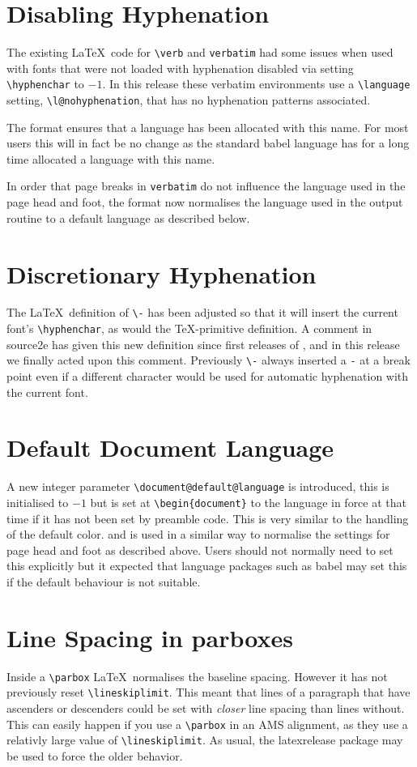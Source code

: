 \documentclass{ltnews}
\begin{document}
\section{Disabling Hyphenation}
The existing \LaTeX\ code for \verb|\verb| and \verb|verbatim| had some
issues when used with fonts that were not loaded with hyphenation
disabled via setting \verb|\hyphenchar| to $-1$. In this release these
verbatim environments use a \verb|\language| setting,
\verb|\l@nohyphenation|, that has no hyphenation patterns associated. 

The format ensures that  a language has been allocated with this name.
For most users this will in fact be no change as the standard
\textsf{babel} language has for a long time allocated a language with
this name.

In order that page breaks in \texttt{verbatim} do not influence the
language used in the page head and foot, the format now normalises the
language used in the output routine to a default language as described
below.
 
\section{Discretionary Hyphenation}
The \LaTeX\ definition of \verb|\-| has been adjusted so that it will
insert the current font's \verb|\hyphenchar|, as would the
\TeX-primitive definition. A comment in \textsf{source2e} has given
this new definition since first releases of \LaTeXe, and in this
release we finally acted upon this comment. Previously \verb|\-|
always inserted a \texttt{-} at a break point even if a different
character would be used for automatic hyphenation with the current font.

\section{Default Document Language}

A new integer parameter \verb|\document@default@language| is
introduced, this is initialised to $-1$ but is set at
\verb|\begin{document}| to the language in force at that time if it
  has not been set by preamble code. This is very similar to the
  handling of the default color.  and is used in a similar way to
  normalise the settings for page head and foot as described above.
Users should not normally need to set this explicitly but it expected that
language packages such as \textsf{babel} may set this if the default
behaviour is not suitable.

\section{Line Spacing in parboxes}
Inside a \verb|\parbox| 
\LaTeX\ normalises the baseline spacing. However it has not
previously reset \verb|\lineskiplimit|. This meant that
lines of a paragraph that have ascenders or descenders could be set
with \emph{closer} line spacing than lines without. This can easily
happen if you use a \verb|\parbox| in an AMS alignment, as they use a
relativly large value of \verb|\lineskiplimit|.
As usual, the \textsf{latexrelease} package may be used to
force the older behavior.
  
\end{document}

